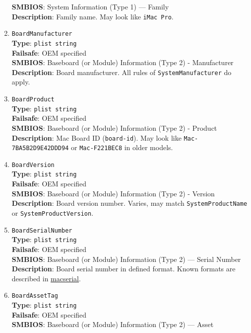 \documentclass[]{article}
\begin{document}
\begin{enumerate}
  \textbf{SMBIOS}: System Information (Type 1) --- Family\\
  \textbf{Description}: Family name. May look like \texttt{iMac\ Pro}.
\item
  \texttt{BoardManufacturer}\\
  \textbf{Type}: \texttt{plist\ string}\\
  \textbf{Failsafe}: OEM specified\\
  \textbf{SMBIOS}: Baseboard (or Module) Information (Type 2) -
  Manufacturer\\
  \textbf{Description}: Board manufacturer. All rules of
  \texttt{SystemManufacturer} do apply.
\item
  \texttt{BoardProduct}\\
  \textbf{Type}: \texttt{plist\ string}\\
  \textbf{Failsafe}: OEM specified\\
  \textbf{SMBIOS}: Baseboard (or Module) Information (Type 2) -
  Product\\
  \textbf{Description}: Mac Board ID (\texttt{board-id}). May look like
  \texttt{Mac-7BA5B2D9E42DDD94} or \texttt{Mac-F221BEC8} in older
  models.
\item
  \texttt{BoardVersion}\\
  \textbf{Type}: \texttt{plist\ string}\\
  \textbf{Failsafe}: OEM specified\\
  \textbf{SMBIOS}: Baseboard (or Module) Information (Type 2) -
  Version\\
  \textbf{Description}: Board version number. Varies, may match
  \texttt{SystemProductName} or \texttt{SystemProductVersion}.
\item
  \texttt{BoardSerialNumber}\\
  \textbf{Type}: \texttt{plist\ string}\\
  \textbf{Failsafe}: OEM specified\\
  \textbf{SMBIOS}: Baseboard (or Module) Information (Type 2) --- Serial
  Number\\
  \textbf{Description}: Board serial number in defined format. Known
  formats are described in
  \href{https://github.com/acidanthera/macserial/blob/master/FORMAT.md}{macserial}.
\item
  \texttt{BoardAssetTag}\\
  \textbf{Type}: \texttt{plist\ string}\\
  \textbf{Failsafe}: OEM specified\\
  \textbf{SMBIOS}: Baseboard (or Module) Information (Type 2) --- Asset

\end{enumerate}
\end{document}
